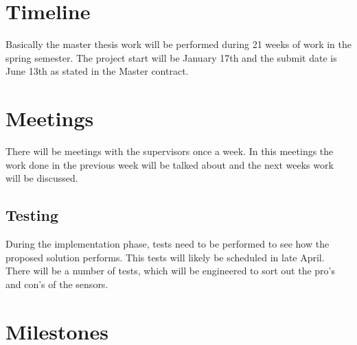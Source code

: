 \documentclass[a4paper, 10pt]{article}
\begin{document}
\section{Timeline}
Basically the master thesis work will be performed during 21 weeks of work in the spring
semester. The project start will be January 17th and the submit date is June 13th as stated in the
Master contract. 


\section{Meetings}
There will be meetings with the supervisors once a week. In this meetings the work done in
the previous week will be talked about and the next weeks work will be discussed.  


\subsection{Testing}
During the implementation phase, tests need to be performed to see how the proposed
solution performs. This tests will likely be scheduled in late April. There will be a number of
tests, which will be engineered to sort out the pro's and con's of the sensors. 


\section{Milestones}
\end{document}
